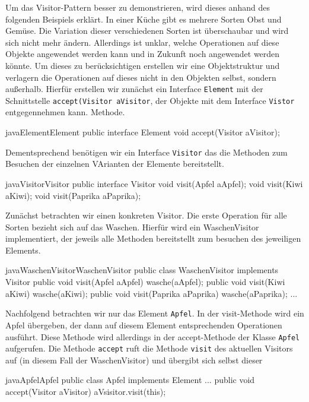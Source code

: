 
Um das Visitor-Pattern besser zu demonstrieren, wird dieses anhand des folgenden Beispiels erklärt. In einer Küche gibt es mehrere Sorten Obst und Gemüse. Die Variation dieser verschiedenen Sorten ist überschaubar und wird sich nicht mehr ändern. Allerdings ist unklar, welche Operationen auf diese Objekte angewendet werden kann und in Zukunft noch angewendet werden könnte. Um dieses zu berücksichtigen erstellen wir eine Objektstruktur und verlagern die Operationen auf dieses nicht in den Objekten selbst, sondern außerhalb. Hierfür erstellen wir zunächst ein Interface \texttt{Element} mit der Schnittstelle \texttt{accept(Visitor aVisitor}, der Objekte mit dem Interface \texttt{Vistor} entgegennehmen kann.  Methode.

\begin{beispiel}{java}{Element}{Element}
public interface Element {
    void accept(Visitor aVisitor);
}
\end{beispiel}

Dementsprechend benötigen wir ein Interface \texttt{Visitor} das die Methoden zum Besuchen der einzelnen VArianten der Elemente bereitstellt.

\begin{beispiel}{java}{Visitor}{Visitor}
public interface Visitor {
    void visit(Apfel aApfel);
    void visit(Kiwi aKiwi);
    void visit(Paprika aPaprika);
}
\end{beispiel}
 
Zunächst betrachten wir einen konkreten Visitor. Die erste Operation für alle Sorten bezieht sich auf das Waschen. Hierfür wird ein WaschenVisitor implementiert, der jeweils alle Methoden bereitstellt zum besuchen des jeweiligen Elements. 


\begin{beispiel}{java}{WaschenVisitor}{WaschenVisitor}
public class WaschenVisitor implements Visitor {
    public void visit(Apfel aApfel) {
        wasche(aApfel);
    }
    public void visit(Kiwi aKiwi) {
        wasche(aKiwi);
    }
    public void visit(Paprika aPaprika) {
        wasche(aPaprika);
    }
    ...
}
\end{beispiel}

Nachfolgend betrachten wir nur das Element \texttt{Apfel}. In der visit-Methode wird ein Apfel übergeben, der dann auf diesem Element entsprechenden Operationen ausführt.
Diese Methode wird allerdings in der accept-Methode der Klasse \texttt{Apfel} aufgerufen. Die Methode \texttt{accept} ruft die Methode \texttt{visit} des aktuellen Visitors auf (in diesem Fall der WaschenVisitor) und übergibt sich selbst dieser



\begin{beispiel}{java}{Apfel}{Apfel}
public class Apfel implements Element {
	...
    public void accept(Visitor aVisitor) {
		aVsisitor.visit(this);
    }
}
\end{beispiel}




